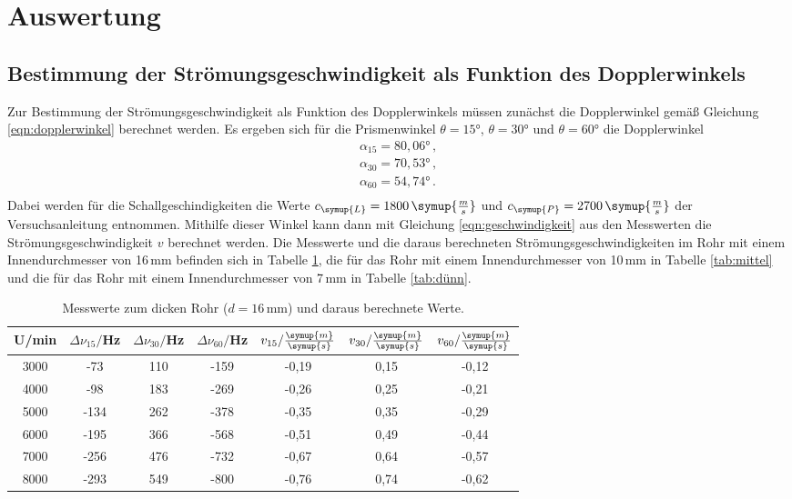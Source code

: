 \section{Auswertung}
\label{sec:Auswertung}

\subsection{Bestimmung der Strömungsgeschwindigkeit als Funktion des Dopplerwinkels}
\label{subsec:geschwindigkeit}

Zur Bestimmung der Strömungsgeschwindigkeit als Funktion des Dopplerwinkels müssen
zunächst die Dopplerwinkel gemäß Gleichung \eqref{eqn:dopplerwinkel} berechnet werden.
Es ergeben sich für die Prismenwinkel $\theta=15°$, $\theta=30°$ und $\theta=60°$
die Dopplerwinkel
\begin{align*}
  \alpha_{15}=80{,}06° \,,\\
  \alpha_{30}=70{,}53°\,,\\
  \alpha_{60}=54{,}74° \,.\\
\end{align*}
Dabei werden für die Schallgeschindigkeiten die Werte $c_{\symup{L}}=1800\,\symup{\frac{m}{s}}$
und $c_{\symup{P}}=2700\,\symup{\frac{m}{s}}$ der Versuchsanleitung \cite{Versuchsanleitung} entnommen.
Mithilfe dieser Winkel kann dann mit Gleichung \eqref{eqn:geschwindigkeit} aus den
Messwerten die Strömungsgeschwindigkeit $v$ berechnet werden. Die Messwerte und die
daraus berechneten Strömungsgeschwindigkeiten im Rohr mit einem Innendurchmesser von
16\,mm befinden sich in Tabelle \ref{tab:dick}, die für das Rohr mit einem
Innendurchmesser von 10\,mm in Tabelle \ref{tab:mittel} und die für das Rohr
mit einem Innendurchmesser von 7\,mm in Tabelle \ref{tab:dünn}.

\begin{table}[htp]
	\begin{center}
    \caption{Messwerte zum dicken Rohr ($d=16\,$mm) und daraus berechnete Werte.}
    \label{tab:dick}
		\begin{tabular}{ccccccc}
		\toprule
			{U/min} & {$\Delta \nu_{15}/$Hz} & {$\Delta \nu_{30}/$Hz} & {$\Delta \nu_{60}/$Hz} &
      {$v_{15}/\frac{\symup{m}}{\symup{s}}$} & {$v_{30}/\frac{\symup{m}}{\symup{s}}$} &
      {$v_{60}/\frac{\symup{m}}{\symup{s}}$}\\
			\midrule
			3000 & -73 & 110 & -159 & -0,19 & 0,15 & -0,12\\
			4000 & -98 & 183 & -269 & -0,26 & 0,25 & -0,21\\
			5000 & -134 & 262 & -378 & -0,35 & 0,35 & -0,29\\
			6000 & -195 & 366 & -568 & -0,51 & 0,49 & -0,44\\
			7000 & -256 & 476 & -732 & -0,67 & 0,64 & -0,57\\
			8000 & -293 & 549 & -800 & -0,76 & 0,74 & -0,62\\
		\bottomrule
		\end{tabular}
	\end{center}
\end{table}

